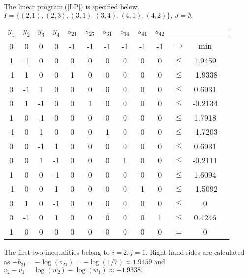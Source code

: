 \documentclass{article}
\theoremstyle{plain}
\begin{document}
The linear program (\ref{LP}) is specif{\kern0pt}ied below. $I=\{(2,1),(2,3),(3,1),(3,4),(4,1),(4,2)\}, \, J=\emptyset.$

\begin{center}
\begin{tabular}{|c|c|c|c|c|c|c|c|c|c|c|c|c|}
$y_1$  & $y_2$ & $y_3$ & $y_4$  & $s_{21}$ & $s_{23}$ & $s_{31}$ & $s_{34}$ & $s_{41}$ & $s_{42}$ & &  \\
\hline
   0   &    0  &   0   &   0    &    -1    &    -1     &    -1    &    -1    &      -1   &    -1     & $\rightarrow$ & $\min$  \\
\hline
\hline
 1 &-1  &  0& 0& 0& 0& 0& 0& 0 &0  & $\leq$ & 1.9459  \\
\hline
-1 &   1 &0 &0& 1 &0& 0 &0& 0 &0  & $\leq$ &  -1.9338  \\
\hline
0 &-1  &  1 &0& 0& 0 &0 &0& 0& 0  & $\leq$ &0.6931  \\
\hline
0 &1& -1  &  0& 0 &1 &0 &0& 0& 0  & $\leq$ &-0.2134  \\
\hline
1 &0& -1  &  0& 0 &0 &0 &0& 0 &0  & $\leq$ &1.7918  \\
\hline
-1  &  0 &1 &0& 0& 0 &1& 0& 0& 0  & $\leq$ &-1.7203  \\
\hline
0 &0& -1  &  1& 0& 0 &0 &0& 0& 0  & $\leq$ &0.6931  \\
\hline
0 &0& 1 &-1  &  0& 0& 0 &1& 0 &0  & $\leq$ &-0.2111  \\
\hline
1 &0 &0 &-1 &   0 &0 &0 &0& 0 &0  & $\leq$ &1.6094  \\
\hline
-1  &  0 &0& 1& 0 &0& 0& 0& 1& 0  & $\leq$ &-1.5092  \\
\hline
0 &1& 0 &-1 &   0& 0& 0& 0 &0 &0  & $\leq$ &0  \\
\hline
0 &-1  &  0& 1 &0& 0 &0& 0& 0 &1  & $\leq$ &0.4246  \\
\hline
   1   &    0  &   0   &   0    &     0    &    0     &     0    &    0    &       0   &    0     &     =       &   0  \\
\hline
\end{tabular}
\end{center}

The f{\kern0pt}irst two inequalities belong to $i=2, j=1.$ Right hand sides are calculated as
$-b_{21}=-\log(a_{21})=-\log(1/7) \approx 1.9459$ and
$v_2-v_1 = \log(w_2)-\log(w_1) \approx -1.9338.$\\
\end{document}
